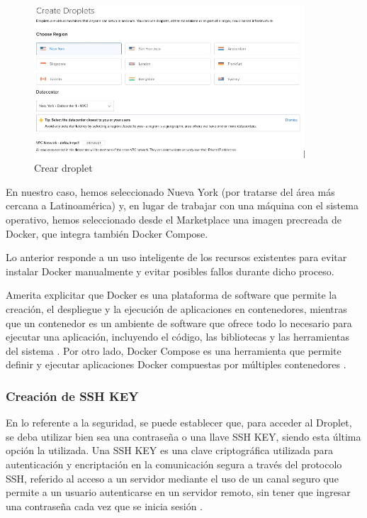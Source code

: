 \begin{figure}[h]
    \centering
    \includegraphics[width=0.9\textwidth]{img/infraestructura/crear-droplet.png}
    \caption{Crear droplet} \label{Img:Web+Creación+de+droplet+en+Digital+Ocean}
\end{figure} 

En nuestro caso, hemos seleccionado Nueva York (por tratarse del área más cercana a Latinoamérica) y, en lugar de trabajar con una máquina con el sistema operativo, hemos seleccionado desde el Marketplace una imagen precreada de Docker, que integra también Docker Compose.

Lo anterior responde a un uso inteligente de los recursos existentes para evitar instalar Docker manualmente y evitar posibles fallos durante dicho proceso.

Amerita explicitar que Docker es una plataforma de software que permite la creación, el despliegue y la ejecución de aplicaciones en contenedores, mientras que un contenedor es un ambiente de software que ofrece todo lo necesario para ejecutar una aplicación, incluyendo el código, las bibliotecas y las herramientas del sistema \cite{web:docker}. Por otro lado, Docker Compose es una herramienta que permite definir y ejecutar aplicaciones Docker compuestas por múltiples contenedores \cite{web:docker-compose}. 

\subsubsection{Creación de SSH KEY}

En lo referente a la seguridad, se puede establecer que, para acceder al Droplet, se deba utilizar bien sea una contraseña o una llave SSH KEY, siendo esta última opción la utilizada. Una SSH KEY es una clave criptográfica utilizada para autenticación y encriptación en la comunicación segura a través del protocolo SSH, referido al acceso a un servidor mediante el uso de un canal seguro que permite a un usuario autenticarse en un servidor remoto, sin tener que ingresar una contraseña cada vez que se inicia sesión \cite{web:ssh-key}.

